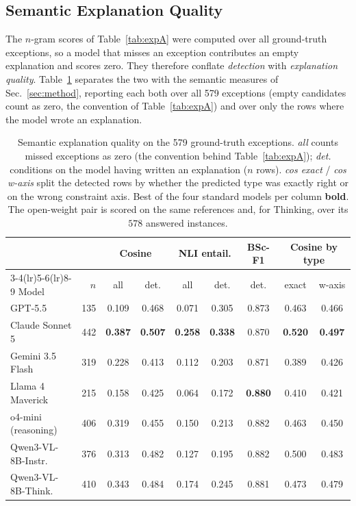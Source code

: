 \documentclass[runningheads]{llncs}
\begin{document}
\subsection{Semantic Explanation Quality}
\label{sec:semantic}

The $n$-gram scores of Table~\ref{tab:expA} were computed over all ground-truth exceptions, so a model that misses an exception contributes an empty explanation and scores zero.
They therefore conflate \emph{detection} with \emph{explanation quality}.
Table~\ref{tab:semantic} separates the two with the semantic measures of Sec.~\ref{sec:method}, reporting each both over all 579 exceptions (empty candidates count as zero, the convention of Table~\ref{tab:expA}) and over only the rows where the model wrote an explanation.

\begin{table}[t]
  \centering
  \footnotesize
  \setlength{\tabcolsep}{4.5pt}
  \caption{Semantic explanation quality on the 579 ground-truth exceptions. \emph{all} counts missed exceptions as zero (the convention behind Table~\ref{tab:expA}); \emph{det.} conditions on the model having written an explanation ($n$ rows). \emph{cos exact} / \emph{cos w-axis} split the detected rows by whether the predicted type was exactly right or on the wrong constraint axis. Best of the four standard models per column \textbf{bold}. The open-weight pair is scored on the same references and, for Thinking, over its $578$ answered instances.}
  \label{tab:semantic}
  \begin{tabular}{lrccccccc}
    \toprule
    & & \multicolumn{2}{c}{Cosine} & \multicolumn{2}{c}{NLI entail.} & BSc-F1 & \multicolumn{2}{c}{Cosine by type} \\
    \cmidrule(lr){3-4}\cmidrule(lr){5-6}\cmidrule(lr){8-9}
    Model & $n$ & all & det. & all & det. & det. & exact & w-axis \\
    \midrule
    GPT-5.5             & 135 & 0.109 & 0.468 & 0.071 & 0.305 & 0.873 & 0.463 & 0.466 \\
    Claude Sonnet 5     & 442 & \textbf{0.387} & \textbf{0.507} & \textbf{0.258} & \textbf{0.338} & 0.870 & \textbf{0.520} & \textbf{0.497} \\
    Gemini 3.5 Flash    & 319 & 0.228 & 0.413 & 0.112 & 0.203 & 0.871 & 0.389 & 0.426 \\
    Llama 4 Maverick    & 215 & 0.158 & 0.425 & 0.064 & 0.172 & \textbf{0.880} & 0.410 & 0.421 \\
    \midrule
    o4-mini (reasoning) & 406 & 0.319 & 0.455 & 0.150 & 0.213 & 0.882 & 0.463 & 0.450 \\
    \midrule
    Qwen3-VL-8B-Instr.  & 376 & 0.313 & 0.482 & 0.127 & 0.195 & 0.882 & 0.500 & 0.483 \\
    Qwen3-VL-8B-Think.  & 410 & 0.343 & 0.484 & 0.174 & 0.245 & 0.881 & 0.473 & 0.479 \\
    \bottomrule
  \end{tabular}
\end{table}
\end{document}
